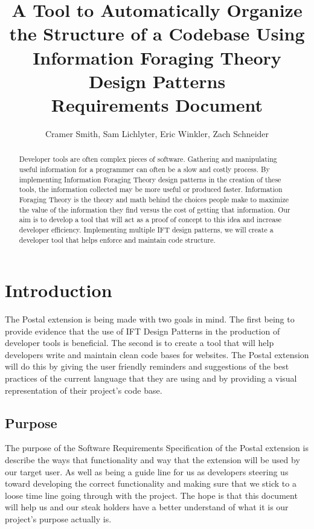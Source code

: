 \documentclass[letterpaper,10pt,titlepage,draftclsnofoot,onecolumn,onesided] {IEEEtran}
\def\doctitle{A Tool to Automatically Organize the Structure of a Codebase Using Information Foraging Theory Design Patterns}
\def\doctype{Requirements Document}
\begin{document}
\title{\Huge{\bfseries{\textsf{\doctitle}}}\\\textsf{\Large{\doctype}}}
\author{Cramer Smith, Sam Lichlyter, Eric Winkler, Zach Schneider}

\maketitle
\vfill
\begin{abstract}

Developer tools are often complex pieces of software. 
Gathering and manipulating useful information for a programmer can often be a slow and costly process. 
By implementing Information Foraging Theory design patterns in the creation of these tools, the information collected may be more useful or produced faster. 
Information Foraging Theory is the theory and math behind the choices people make to maximize the value of the information they find versus the cost of getting that information.
Our aim is to develop a tool that will act as a proof of concept to this idea and increase developer efficiency.
Implementing multiple IFT design patterns, we will create a developer tool that helps enforce and maintain code structure. 

\end{abstract}
\vfill

\pagebreak

\tableofcontents

\pagebreak

\section{Introduction}

The Postal extension is being made with two goals in mind.
The first being to provide evidence that the use of IFT Design Patterns in the production of developer tools is beneficial. 
The second is to create a tool that will help developers write and maintain clean code bases for websites.
The Postal extension will do this by giving the user friendly reminders and suggestions of the best practices of the current language that they are using and by providing a visual representation of their project's code base.

\subsection{Purpose}
The purpose of the Software Requirements Specification of the Postal extension is describe the ways that functionality and way that the extension will be used by our target user. 
As well as being a guide line for us as developers steering us toward developing the correct functionality and making sure that we stick to a loose time line going through with the project.
The hope is that this document will help us and our steak holders have a better understand of what it is our project's purpose actually is.
\end{document}
